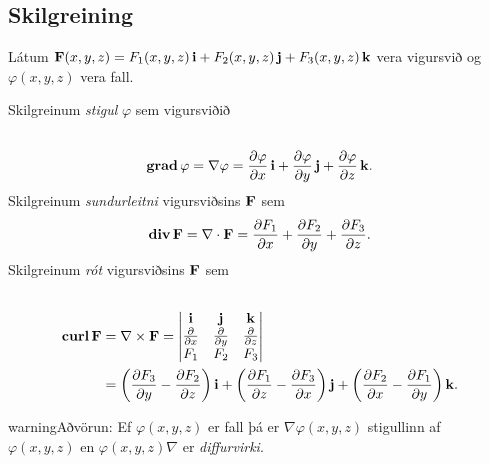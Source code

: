 \documentclass[a4paper,10pt,icelandic]{sphinxmanual}
\begin{document}
\subsection{Skilgreining}
\label{Kafli6:id1}
Látum
\(\mbox{${\bf F}$}(x,y,z)=F_1(x,y,z)\,\mbox{${\bf i}$}+F_2(x,y,z)\,\mbox{${\bf j}$}+F_3(x,y,z)\,\mbox{${\bf k}$}\)
vera vigursvið og \(\varphi(x,y,z)\) vera fall.

Skilgreinum \textit{stigul} \(\varphi\) sem vigursviðið
\begin{gather}
\begin{split}\displaystyle\end{split}\notag\\\begin{split}\mbox{${\rm\bf grad\,}$}\varphi=\nabla\varphi=\frac{\partial \varphi}{\partial x}\,\mbox{${\bf i}$}+
\frac{\partial \varphi}{\partial y}\,\mbox{${\bf j}$}+\frac{\partial \varphi}{\partial z}\,\mbox{${\bf k}$}.\end{split}\notag
\end{gather}
Skilgreinum \textit{sundurleitni} vigursviðsins
\(\mbox{${\bf F}$}\) sem
\begin{gather}
\begin{split}\displaystyle \mbox{${\rm\bf div\,}$}\mbox{${\bf F}$}=\nabla\cdot\mbox{${\bf F}$}=\frac{\partial F_1}{\partial x}+\frac{\partial F_2}{\partial y}+\frac{\partial F_3}{\partial z}.\end{split}\notag
\end{gather}
Skilgreinum \textit{rót} vigursviðsins \(\mbox{${\bf F}$}\) sem
\begin{gather}
\begin{split}\displaystyle\end{split}\notag\\\begin{split}\begin{aligned}
 \mbox{${\rm\bf curl\,}$}\mbox{${\bf F}$}&=\nabla\times\mbox{${\bf F}$}=\begin{vmatrix} \mbox{${\bf i}$}&\mbox{${\bf j}$}&\mbox{${\bf k}$}\\
 \frac{\partial} {\partial x}&\frac{\partial}{\partial y}&\frac{\partial}{\partial z}\\F_1&F_2&F_3\end{vmatrix} \\ &=\bigg(\frac{\partial F_3}{\partial y}-\frac{\partial F_2}{\partial z}\bigg)\,\mbox{${\bf i}$}+\bigg(\frac{\partial F_1}{\partial z}-\frac{\partial F_3}{\partial x}\bigg)\,\mbox{${\bf j}$}+\bigg(\frac{\partial F_2}{\partial x}-\frac{\partial F_1}{\partial y}\bigg)\,\mbox{${\bf k}$}.
 \end{aligned}\end{split}\notag
\end{gather}
\begin{notice}{warning}{Aðvörun:}
Ef \(\varphi(x,y,z)\) er fall þá er \(\nabla \varphi(x,y,z)\) stigullinn af \(\varphi(x,y,z)\) en \(\varphi(x,y,z)\nabla\) er \textit{diffurvirki}.
\end{notice}
\end{document}
